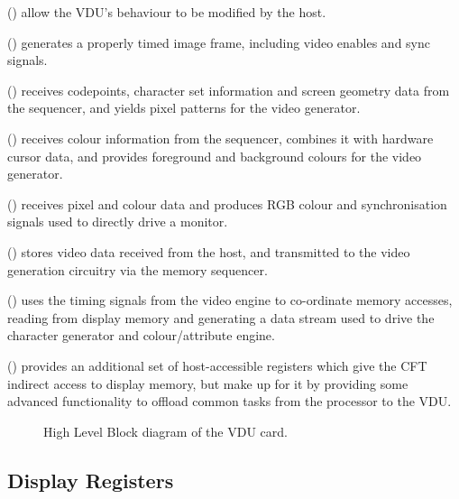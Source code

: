 \begin{description}

 () allow the VDU's
behaviour to be modified by the host.

 () generates a properly timed
image frame, including video enables and sync signals.

 () receives codepoints,
character set information and screen geometry data from the sequencer, and
yields pixel patterns for the video generator.

 () receives colour
information from the sequencer, combines it with hardware cursor data, and
provides foreground and background colours for the video generator.

 () receives pixel and
colour data and produces RGB colour and synchronisation signals used to
directly drive a monitor.

 () stores video data received
from the host, and transmitted to the video generation circuitry via the memory
sequencer.

 () uses the timing
signals from the video engine to co-ordinate memory accesses, reading from
display memory and generating a data stream used to drive the character
generator and colour/attribute engine.

 () provides an additional
set of host-accessible registers which give the CFT indirect access to display
memory, but make up for it by providing some advanced functionality to offload
common tasks from the processor to the VDU.

\end{description}


\begin{figure}
 \centering
 \caption[High Level Block Diagram of the VDU
   Card]{\label{fig:vdu:block-diagram} High Level Block diagram of the VDU
   card.}
\end{figure}


\subsection{Display Registers}
\label{sec:vdu:display-registers}

